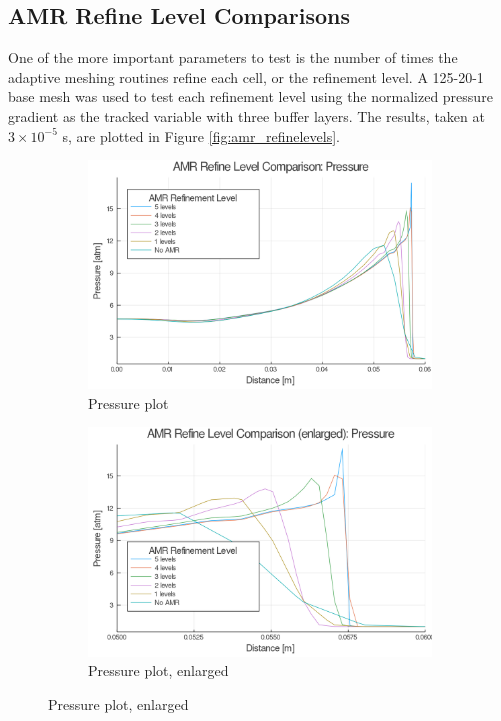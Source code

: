 \subsection{AMR Refine Level Comparisons}
One of the more important parameters to test is the number of times the adaptive meshing routines refine each cell, or the refinement level. A 125-20-1 base mesh was used to test each refinement level using the normalized pressure gradient as the tracked variable with three buffer layers. The results, taken at \(3\times 10^{ - 5}\) s, are plotted in Figure \ref{fig:amr_refinelevels}.
\begin{figure}[]
    \centering
    \begin{subfigure}[]{\textwidth}
        \centering
        \includegraphics[width=\textwidth]{./figs/amrfigs/amr_refinelevels/p.png}
        \caption{Pressure plot}
    \end{subfigure}

    \centering
    \begin{subfigure}[]{\textwidth}
        \centering
        \includegraphics[width=\textwidth]{./figs/amrfigs/amr_refinelevels/pe.png}
        \caption{Pressure plot, enlarged}
    \end{subfigure}

\end{figure}
